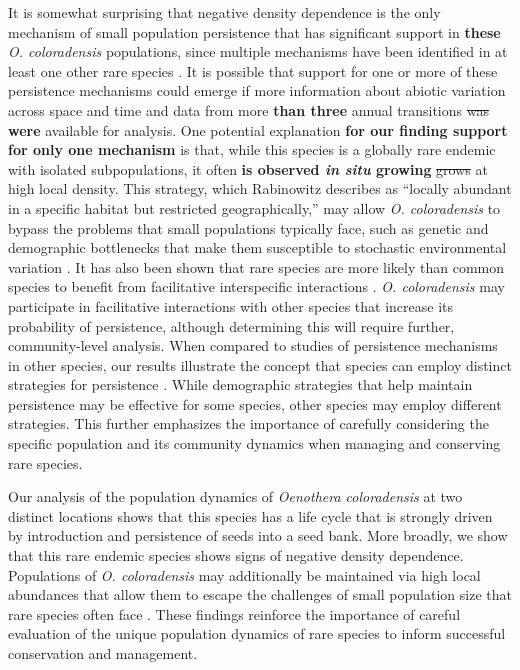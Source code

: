 \documentclass[12pt, letterpaper]{article}
\begin{document}
It is somewhat surprising that negative density dependence is the only mechanism of small population persistence that has significant support in \textbf{these} \textit{O. coloradensis} populations, since multiple mechanisms have been identified in at least one other rare species \cite{Dibner2019}. It is possible that support for one or more of these persistence mechanisms could emerge if more information about abiotic variation across space and time and data from more \textbf{than three} annual transitions \sout{was} \textbf{were} available for analysis. One potential explanation \textbf{for our finding support for only one mechanism} is that, while this species is a globally rare endemic with isolated subpopulations, it often \textbf{is observed \textit{in situ} growing} \sout{grows} at high local density. This strategy, which Rabinowitz describes as “locally abundant in a specific habitat but restricted geographically,” may allow \textit{O. coloradensis} to bypass the problems that small populations typically face, such as genetic and demographic bottlenecks that make them susceptible to stochastic environmental variation \cite{Rabinowitz1981SevenRarity}. It has also been shown that rare species are more likely than common species to benefit from facilitative interspecific interactions \cite{Calatayud2020PositiveAssemblages}. \textit{O. coloradensis} may participate in facilitative interactions with other species that increase its probability of persistence, although determining this will require further, community-level analysis. When compared to studies of persistence mechanisms in other species, our results illustrate the concept that species can employ distinct strategies for persistence \cite{Rabinowitz1981SevenRarity}. While demographic strategies that help maintain persistence may be effective for some species, other species may employ different strategies. This further emphasizes the importance of carefully considering the specific population and its community dynamics when managing and conserving rare species.  

Our analysis of the population dynamics of \textit{Oenothera coloradensis} at two distinct locations shows that this species has a life cycle that is strongly driven by introduction and persistence of seeds into a seed bank. More broadly, we show that this rare endemic species shows signs of negative density dependence. Populations of \textit{O. coloradensis} may additionally be maintained via high local abundances that allow them to escape the challenges of small population size that rare species often face \cite{Rabinowitz1981SevenRarity}. These findings reinforce the importance of careful evaluation of the unique population dynamics of rare species to inform successful conservation and management.  


\end{document}

